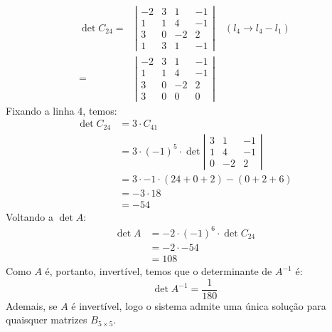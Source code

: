 \begin{align*}
    \det C_{24} = &\left|\begin{array}{cccc}
         -2 & 3 & 1 & -1 \\
         1 & 1 & 4 & -1 \\
         3 & 0 & -2 & 2 \\
         1 & 3 & 1 & -1
    \end{array}\right| \quad (l_4 \rightarrow l_4 - l_1) \\
    = &\left|\begin{array}{cccc}
         -2 & 3 & 1 & -1 \\
         1 & 1 & 4 & -1 \\
         3 & 0 & -2 & 2 \\
         3 & 0 & 0 & 0
    \end{array}\right| 
\end{align*}
Fixando a linha 4, temos:
\begin{align*}
    \det C_{24} &= 3 \cdot C_{41} \\
    &= 3 \cdot (-1)^5 \cdot \det \left|\begin{array}{ccc}
         3 & 1 & -1 \\
         1 & 4 & -1 \\
         0 & -2 & 2
    \end{array}\right| \\
    &= 3 \cdot -1 \cdot (24 + 0 + 2) - (0 + 2 + 6) \\
    &= -3 \cdot 18 \\
    &= -54
\end{align*}
Voltando a $\det A$:
\begin{align*}
    \det A &= -2 \cdot (-1)^{6} \cdot \det C_{24} \\ 
    &= -2 \cdot -54 \\ 
    &= 108
\end{align*}
Como $A$ é, portanto, invertível, temos que o determinante de $A^{-1}$ é:
\begin{displaymath}
    \det A^{-1} = \frac{1}{180}
\end{displaymath}
Ademais, se $A$ é invertível, logo o sistema admite uma única solução para quaisquer matrizes $B_{5\times5}.$ 